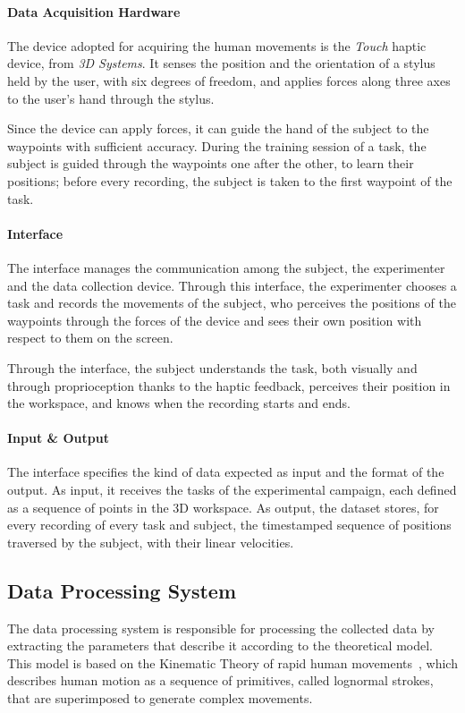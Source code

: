 \documentclass[12pt]{report}
\begin{document}
\paragraph{Data Acquisition Hardware}
The device adopted for acquiring the human movements is the \textit{Touch} haptic device, from \textit{3D Systems}. It senses the position and the orientation of a stylus held by the user, with six degrees of freedom, and applies forces along three axes to the user's hand through the stylus.

Since the device can apply forces, it can guide the hand of the subject to the waypoints with sufficient accuracy. During the training session of a task, the subject is guided through the waypoints one after the other, to learn their positions; before every recording, the subject is taken to the first waypoint of the task.

\paragraph{Interface}
The interface manages the communication among the subject, the experimenter and the data collection device. Through this interface, the experimenter chooses a task and records the movements of the subject, who perceives the positions of the waypoints through the forces of the device and sees their own position with respect to them on the screen.

Through the interface, the subject understands the task, both visually and through proprioception thanks to the haptic feedback, perceives their position in the workspace, and knows when the recording starts and ends.

\paragraph{Input \& Output}
The interface specifies the kind of data expected as input and the format of the output. As input, it receives the tasks of the experimental campaign, each defined as a sequence of points in the 3D workspace. As output, the dataset stores, for every recording of every task and subject, the timestamped sequence of positions traversed by the subject, with their linear velocities.

\subsection{Data Processing System}
\label{sec:data_processing_system}
The data processing system is responsible for processing the collected data by extracting the parameters that describe it according to the theoretical model. This model is based on the Kinematic Theory of rapid human movements~\cite{plamondon1995a}, which describes human motion as a sequence of primitives, called lognormal strokes, that are superimposed to generate complex movements.
\end{document}
